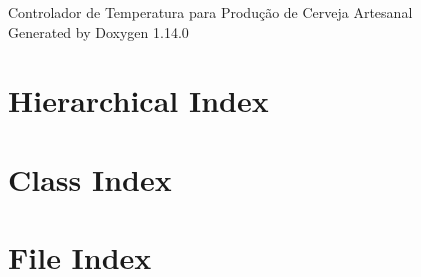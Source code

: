 \documentclass[twoside]{book}
\newcommand{\+}{\discretionary{\mbox{\scriptsize$\hookleftarrow$}}{}{}}
\newcommand{\clearemptydoublepage}{%
    \newpage{\pagestyle{empty}\cleardoublepage}%
  }
\begin{document}
  \raggedbottom
    \hypersetup{pageanchor=false,
                bookmarksnumbered=true,
                pdfencoding=unicode
               }
  \begin{titlepage}
  \vspace*{7cm}
  \begin{center}%
  {\Large Controlador de Temperatura para Produção de Cerveja Artesanal}\\
  \vspace*{1cm}
  {\large Generated by Doxygen 1.14.0}\\
  \end{center}
  \end{titlepage}
  \clearemptydoublepage
  \tableofcontents
  \clearemptydoublepage
  \hypersetup{pageanchor=true}
\chapter{Hierarchical Index}

\chapter{Class Index}

\chapter{File Index}

\end{document}
